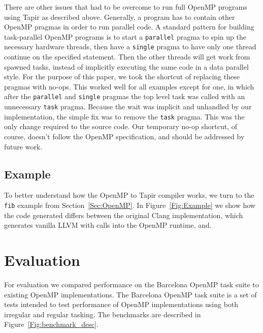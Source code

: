 \documentclass[sigconf]{acmart}
\begin{document}
There are other issues that had to be overcome to run full OpenMP programs
using Tapir as described above. Generally, a program has to contain other
OpenMP pragmas in order to run parallel code. A standard pattern for building
task-parallel OpenMP programs is to start a \texttt{parallel} pragma to spin up
the necessary hardware threads, then have a \texttt{single} pragma to have only
one thread continue on the specified statement. Then the other threads will get
work from spawned tasks, instead of implicitly executing the same code in a
data parallel style. For the purpose of this paper, we took the shortcut of
replacing these pragmas with no-ops. This worked well for all examples except
for one, in which after the \texttt{parallel} and \texttt{single} pragmas the
top level task was called with an unnecessary \texttt{task} pragma. Because the
wait was implicit and unhandled by our implementation, the simple fix was to
remove the \texttt{task} pragma. This was the only change required to the 
source code. Our temporary no-op shortcut, of course, doesn't follow the OpenMP
specification, and should be addressed by future work. 

\subsection{Example} \label{Sec:Example}

To better understand how the OpenMP to Tapir compiler works, we turn to the
\texttt{fib} example from Section~\ref{Sec:OpenMP}. In Figure~\ref{Fig:Example}
we show how the code generated differs between the original Clang
implementation, which generates vanilla LLVM with calls into the OpenMP
runtime, and. 

\section{Evaluation}

For evaluation we compared performance on the Barcelona OpenMP task suite to 
existing OpenMP implementations. The Barcelona OpenMP task suite is a set of 
tests intended to test performance of OpenMP implementations using both
irregular and regular tasking. The benchmarks are described in
Figure~\ref{Fig:benchmark_desc}. 
\end{document}
